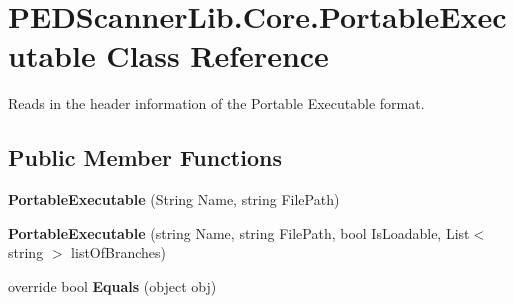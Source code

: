\hypertarget{class_p_e_d_scanner_lib_1_1_core_1_1_portable_executable}{}\section{P\+E\+D\+Scanner\+Lib.\+Core.\+Portable\+Executable Class Reference}
\label{class_p_e_d_scanner_lib_1_1_core_1_1_portable_executable}


Reads in the header information of the Portable Executable format.  


\subsection*{Public Member Functions}
\begin{DoxyCompactItemize}
\item 
\mbox{\label{class_p_e_d_scanner_lib_1_1_core_1_1_portable_executable_af537874ef711c7c088dcb0a73871017f}} 
{\bfseries Portable\+Executable} (String Name, string File\+Path)
\item 
\mbox{\label{class_p_e_d_scanner_lib_1_1_core_1_1_portable_executable_a9e859c439892ff44135e635b5b0d8606}} 
{\bfseries Portable\+Executable} (string Name, string File\+Path, bool Is\+Loadable, List$<$ string $>$ list\+Of\+Branches)
\item 
\mbox{\label{class_p_e_d_scanner_lib_1_1_core_1_1_portable_executable_a07d1028d738d3d4dde9d1b7747728362}} 
override bool {\bfseries Equals} (object obj)
\end{DoxyCompactItemize}
